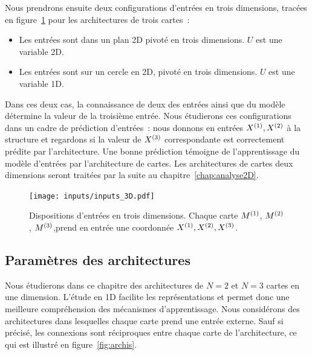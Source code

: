 \documentclass[../main]{subfiles}
\begin{document}
Nous prendrons ensuite deux configurations d'entrées en trois dimensions, tracées en figure~\ref{fig:inputs_3D} pour les architectures de trois cartes~:
\begin{itemize}
	\item Les entrées sont dans un plan 2D pivoté en trois dimensions. $U$ est une variable 2D.
	\item Les entrées sont sur un cercle en 2D, pivoté en trois dimensions. $U$ est une variable 1D.
\end{itemize}

Dans ces deux cas, la connaissance de deux des entrées ainsi que du modèle détermine la valeur de la troisième entrée. 
Nous étudierons ces configurations dans un cadre de prédiction d'entrées~: nous donnons en entrées $X^{({1})}, X^{({2})}$ à la structure et regardons si la valeur de $X^{({3})}$ correspondante est correctement prédite par l'architecture. 
Une bonne prédiction témoigne de l'apprentissage du modèle d'entrées par l'architecture de cartes.
Les architectures de cartes deux dimensions seront traitées par la suite au chapitre~\ref{chap:analyse2D}.


\begin{figure}[h!]
	\texttt{[image: inputs/inputs\_3D.pdf]}
	\caption{Dispositions d'entrées en trois dimensions. Chaque carte $M^{({1})}$, $M^{({2})}$, $M^{({3})}$,prend en entrée une coordonnée $X^{({1})}, X^{({2})}, X^{({3})}$. \label{fig:inputs_3D}}
\end{figure}

\subsection{Paramètres des architectures}

Nous étudierons dans ce chapitre des architectures de $N = 2$ et $N=3$ cartes en une dimension. L'étude en 1D facilite les représentations et permet donc une meilleure compréhension des mécanismes d'apprentissage.
Nous considérons des architectures dans lesquelles chaque carte prend une entrée externe. 
Sauf si précisé, les connexions sont réciproques entre chaque carte de l'architecture, ce qui est illustré en figure~\ref{fig:archis}.
\end{document}
